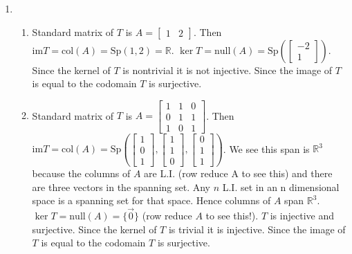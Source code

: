 \begin{SaveQuestion}
\begin{enumerate}
        \item 
    \begin{enumerate}
        \item Standard matrix of $T$ is $A=\begin{bmatrix}
			1&2
			\end{bmatrix}$. Then $\mathrm{im} T=\mathrm{col} (A)=\mathrm{Sp}(1,2)=\mathbb R$. $\ker T= \mathrm{null}(A)=\mathrm{Sp}(\begin{bmatrix}
			-2\\1
			\end{bmatrix})$. Since the kernel of $T$ is nontrivial it is not injective. Since the image of $T$ is equal to the codomain $T$ is surjective.
        \item Standard matrix of $T$ is $A=\begin{bmatrix}
			1&1&0\\0&1&1\\1&0&1
			\end{bmatrix}$. Then $\mathrm{im} T=\mathrm{col} (A)=\mathrm{Sp}(\begin{bmatrix}
			1\\0\\1
			\end{bmatrix},\begin{bmatrix}
			1\\1\\0
			\end{bmatrix}, \begin{bmatrix}
			0\\1\\1 \end{bmatrix})$. 
            We see this span is $\mathbb R^3$ because the columns of $A$ are L.I. (row reduce A to see this) and there are three vectors in the spanning set. 
            Any $n$ L.I. set in an n dimensional space is a spanning set for that space. 
            Hence columns of $A$ span $\mathbb R^3$. 
            $\ker T= \mathrm{null}(A)=\{\vec 0\}$ 
            (row reduce $A$ to see this!). $T$ is injective and surjective. 
            Since the kernel of $T$ is trivial it is injective. 
            Since the image of $T$ is equal to the codomain $T$ is surjective.
    \end{enumerate}
    \end{enumerate}
\end{SaveQuestion}


